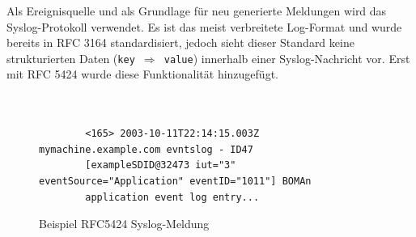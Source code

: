 Als Ereignisquelle und als Grundlage für neu generierte Meldungen wird das 
Syslog-Protokoll verwendet. Es ist das meist verbreitete Log-Format und wurde 
bereits in RFC 3164 standardisiert, jedoch sieht dieser Standard keine strukturierten 
Daten (\texttt{key $\Rightarrow$ value}) innerhalb einer Syslog-Nachricht vor. 
Erst mit RFC 5424 \cite{rfc5424} wurde diese Funktionalität hinzugefügt.

\begin{table}[ht]
    \caption{Aufbau RFC 5424}
    \label{table:rfc5424}\vspace{0.2cm}
\end{table}

\newpage

\begin{figure}[h]
    \caption{Beispiel RFC5424 Syslog-Meldung}
    \label{log_example}\vspace{0.2cm}
    \centering
    \begin{shaded*}
    \small{
        \begin{verbatim}
        
        
        <165> 2003-10-11T22:14:15.003Z mymachine.example.com evntslog - ID47 
        [exampleSDID@32473 iut="3" eventSource="Application" eventID="1011"] BOMAn 
        application event log entry...
        \end{verbatim}}
    \end{shaded*}
\end{figure}





